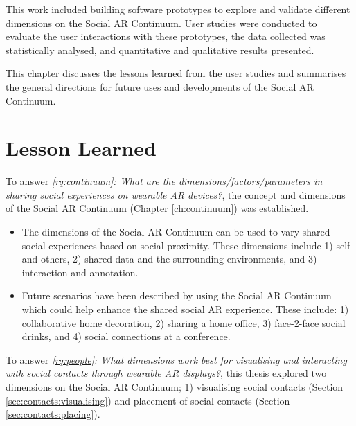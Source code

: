 This work included building software prototypes to explore and validate different dimensions on the Social AR Continuum. User studies were conducted to evaluate the user interactions with these prototypes, the data collected was statistically analysed, and quantitative and qualitative results presented.

This chapter discusses the lessons learned from the user studies and summarises the general directions for future uses and developments of the Social AR Continuum. 

\pagebreak

\section{Lesson Learned}
\noindent
To answer \textit{\ref{rq:continuum}: What are the dimensions/factors/parameters in sharing social experiences on wearable AR devices?}, the concept and dimensions of the Social AR Continuum (Chapter \ref{ch:continuum}) was established.

\begin{itemize}
    \item{The dimensions of the Social AR Continuum can be used to vary shared social experiences based on social proximity. These dimensions include 1) self and others, 2) shared data and the surrounding environments, and 3) interaction and annotation.}
    \item{Future scenarios have been described by using the Social AR Continuum which could help enhance the shared social AR experience. These include: 1) collaborative home decoration, 2) sharing a home office, 3) face-2-face social drinks, and 4) social connections at a conference.}
\end{itemize}

\noindent
To answer \textit{\ref{rq:people}: What dimensions work best for visualising and interacting with social contacts through wearable AR displays?}, this thesis explored two dimensions on the Social AR Continuum; 1) visualising social contacts (Section \ref{sec:contacts:visualising}) and placement of social contacts (Section \ref{sec:contacts:placing}). 

